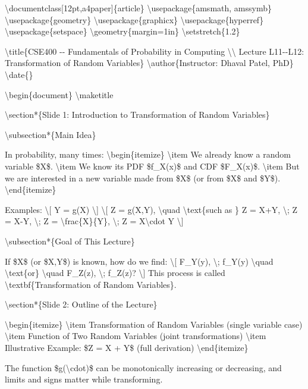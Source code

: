 \textbackslash documentclass{[}12pt,a4paper{]}\{article\}
\textbackslash usepackage\{amsmath, amssymb\}
\textbackslash usepackage\{geometry\}
\textbackslash usepackage\{graphicx\}
\textbackslash usepackage\{hyperref\}
\textbackslash usepackage\{setspace\}
\textbackslash geometry\{margin=1in\} \textbackslash setstretch\{1.2\}

\textbackslash title\{CSE400 -\/- Fundamentals of Probability in
Computing \textbackslash\textbackslash{} Lecture L11-\/-L12:
Transformation of Random Variables\} \textbackslash author\{Instructor:
Dhaval Patel, PhD\} \textbackslash date\{\}

\textbackslash begin\{document\} \textbackslash maketitle

\textbackslash section*\{Slide 1: Introduction to Transformation of
Random Variables\}

\textbackslash subsection*\{Main Idea\}

In probability, many times: \textbackslash begin\{itemize\}
\textbackslash item We already know a random variable \$X\$.
\textbackslash item We know its PDF \$f\_X(x)\$ and CDF \$F\_X(x)\$.
\textbackslash item But we are interested in a new variable made from
\$X\$ (or from \$X\$ and \$Y\$). \textbackslash end\{itemize\}

Examples: \textbackslash{[} Y = g(X) \textbackslash{]} \textbackslash{[}
Z = g(X,Y), \textbackslash quad \textbackslash text\{such as \} Z = X+Y,
\textbackslash; Z = X-Y, \textbackslash; Z =
\textbackslash frac\{X\}\{Y\}, \textbackslash; Z = X\textbackslash cdot
Y \textbackslash{]}

\textbackslash subsection*\{Goal of This Lecture\}

If \$X\$ (or \$X,Y\$) is known, how do we find: \textbackslash{[}
F\_Y(y), \textbackslash; f\_Y(y) \textbackslash quad
\textbackslash text\{or\} \textbackslash quad F\_Z(z), \textbackslash;
f\_Z(z)? \textbackslash{]} This process is called
\textbackslash textbf\{Transformation of Random Variables\}.

\textbackslash section*\{Slide 2: Outline of the Lecture\}

\textbackslash begin\{itemize\} \textbackslash item Transformation of
Random Variables (single variable case) \textbackslash item Function of
Two Random Variables (joint transformations) \textbackslash item
Illustrative Example: \$Z = X + Y\$ (full derivation)
\textbackslash end\{itemize\}

The function \$g(\textbackslash cdot)\$ can be monotonically increasing
or decreasing, and limits and signs matter while transforming.

